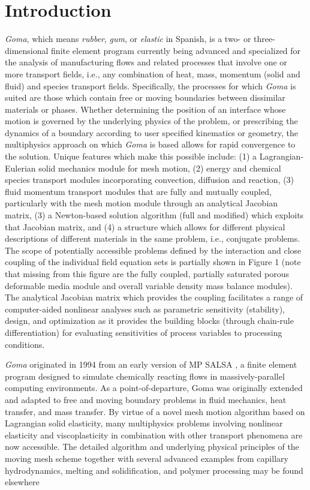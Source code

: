 \chapter{Introduction}
%
%
\emph{Goma}, which means \emph{rubber}, \emph{gum}, or \emph{elastic} in Spanish, is a two- or three-dimensional finite element program currently being advanced and specialized for the analysis of manufacturing flows and related processes that involve one or more transport fields, i.e., any combination of heat, mass, momentum (solid and fluid) and species transport fields. Specifically, the processes for which \emph{Goma} is suited are those which contain free or moving boundaries between dissimilar materials or phases. Whether determining the position of an interface whose motion is governed by the underlying physics of the problem, or prescribing the dynamics of a boundary according to user specified kinematics or geometry, the multiphysics approach on which \emph{Goma} is based allows
for rapid convergence to the solution. Unique features which make this possible include: (1) a Lagrangian-Eulerian solid mechanics module for mesh motion, (2) energy and chemical species transport modules incorporating convection, diffusion and reaction, (3) fluid momentum transport modules that are fully and mutually coupled, particularly with the mesh motion module through an analytical Jacobian matrix, (3) a Newton-based solution algorithm (full and modified) which exploits that Jacobian matrix, and (4) a structure which allows for different physical descriptions of different materials in the same problem, i.e., conjugate problems. The scope of potentially accessible problems defined by the interaction and close coupling of the individual field equation sets is partially shown in Figure 1 (note that missing from this figure are the fully coupled, partially saturated porous deformable media module and overall variable density mass balance modules). The analytical Jacobian matrix which provides the coupling facilitates a range of computer-aided nonlinear analyses such as parametric sensitivity (stability), design, and optimization as it provides the building blocks (through chain-rule differentiation) for evaluating sensitivities of process variables to processing conditions. 

\emph{Goma} originated in 1994 from an early version of MP SALSA \citep{MP_SALSA}, a finite element program designed to simulate chemically reacting flows in massively-parallel computing environments. As a point-of-departure, Goma was originally extended and adapted to free and moving boundary problems in fluid mechanics, heat transfer, and mass transfer. By virtue of a novel mesh motion algorithm based on Lagrangian solid elasticity, many multiphysics problems involving nonlinear elasticity and viscoplasticity in combination with other transport phenomena are now accessible. The detailed algorithm and underlying physical principles of the moving mesh scheme together with several advanced examples from capillary hydrodynamics, melting and solidification, and polymer processing may be found elsewhere \citep{Goma_two_phase_flow,  SolGelProceeding, BladeProceeding, PseudoSolid,Goma_remelting, GomaFEM_part1, GomaFEM_part2, Goma_iterative_solver}

